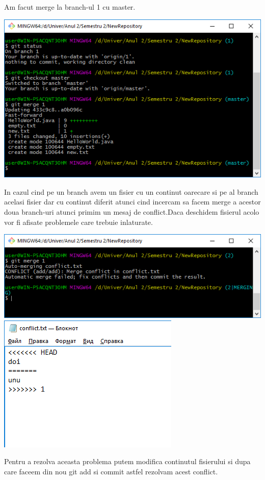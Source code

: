 Am facut merge la branch-ul 1 cu master.\\
\begin{center}
\includegraphics[scale=0.75]{images/14}\\
\end{center}

In cazul cind pe un branch avem un fisier cu un continut oarecare si pe al branch acelasi fisier dar cu continut diferit atunci cind incercam sa facem merge a acestor doua branch-uri atunci primim un mesaj de conflict.Daca deschidem fisierul acolo vor fi afisate problemele care trebuie inlaturate.\\
\begin{center}
\includegraphics[scale=0.7]{images/15}\\
\includegraphics[scale=0.7]{images/16}\\
\end{center}
Pentru a rezolva aceasta problema putem modifica continutul fisierului si dupa care faceem din nou git add si commit astfel rezolvam acest conflict.\\

\clearpage